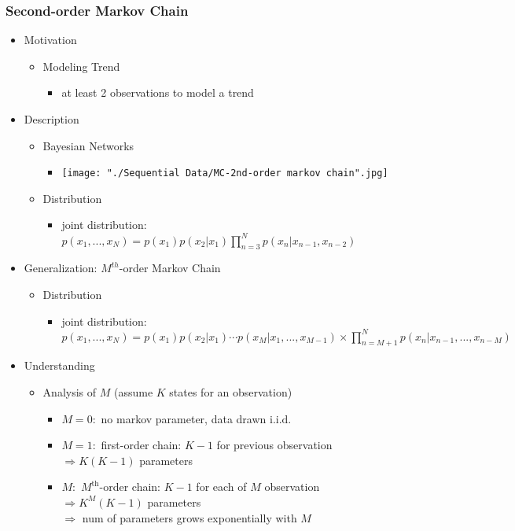 \subsubsection{Second-order Markov Chain}
\begin{itemize}
\item Motivation
	\begin{itemize}
	\item Modeling Trend
		\begin{itemize}
		\item at least 2 observations to model a trend
		\end{itemize}
	\end{itemize}
\item Description
	\begin{itemize}
	\item Bayesian Networks
		\begin{itemize}
		\item \texttt{[image: "./Sequential Data/MC-2nd-order markov chain".jpg]}
		\end{itemize}
	\item Distribution
		\begin{itemize}
		\item joint distribution: $\displaystyle p(x_1,...,x_N) = p(x_1)p(x_2|x_1) \prod _{n=3}^N p(x_n|x_{n-1},x_{n-2})$
		\end{itemize}
	\end{itemize}
\item Generalization: $M^{th}$-order Markov Chain
	\begin{itemize}
	\item Distribution
		\begin{itemize}
		\item joint distribution: $\displaystyle p(x_1,...,x_N) = p(x_1)p(x_2|x_1)\cdots p(x_M|x_1,...,x_{M-1}) \times \prod_{n=M+1}^N p(x_n|x_{n-1},...,x_{n-M})$
		\end{itemize}
	\end{itemize}
\item Understanding
	\begin{itemize}
	\item Analysis of $M$ (assume $K$ states for an observation)
		\begin{itemize}
		\item $M=0:$ no markov parameter, data drawn $\text{i.i.d.}$
		\item $M=1:$ first-order chain: $K-1$ for previous observation $\Rightarrow K(K-1)$ parameters
		\item $M:$ $M^{\text{th}}$-order chain: $K-1$ for each of $M$ observation $\Rightarrow K^M(K-1)$ parameters \\
		$\Rightarrow$ num of parameters grows exponentially with $M$
		\end{itemize}
	\end{itemize}
\end{itemize}


